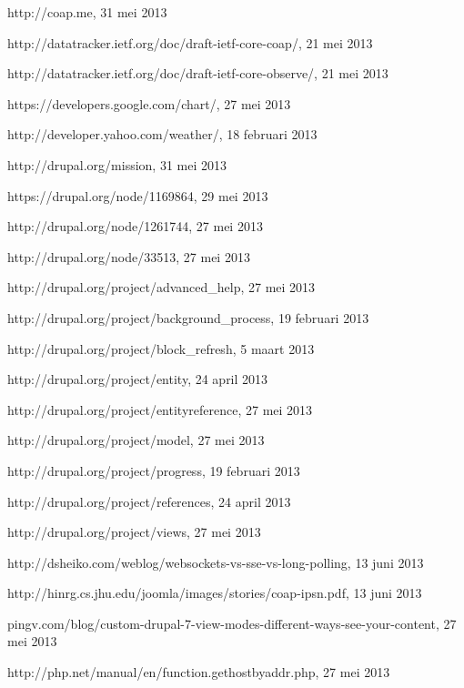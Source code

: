 \begin{thebibliography}{99}
 http://coap.me, 31 mei 2013

 http://datatracker.ietf.org/doc/draft-ietf-core-coap/, 21 mei 2013

 http://datatracker.ietf.org/doc/draft-ietf-core-observe/, 21 mei 2013

 https://developers.google.com/chart/, 27 mei 2013

 http://developer.yahoo.com/weather/, 18 februari 2013

 http://drupal.org/mission, 31 mei 2013

 https://drupal.org/node/1169864, 29 mei 2013

 http://drupal.org/node/1261744, 27 mei 2013

 http://drupal.org/node/33513, 27 mei 2013

 http://drupal.org/project/advanced\_help, 27 mei 2013

 http://drupal.org/project/background\_process, 19 februari 2013

 http://drupal.org/project/block\_refresh, 5 maart 2013

 http://drupal.org/project/entity, 24 april 2013

 http://drupal.org/project/entityreference, 27 mei 2013

 http://drupal.org/project/model, 27 mei 2013

 http://drupal.org/project/progress, 19 februari 2013

 http://drupal.org/project/references, 24 april 2013

 http://drupal.org/project/views, 27 mei 2013

 http://dsheiko.com/weblog/websockets-vs-sse-vs-long-polling, 13 juni 2013

 http://hinrg.cs.jhu.edu/joomla/images/stories/coap-ipsn.pdf, 13 juni 2013

 pingv.com/blog/custom-drupal-7-view-modes-different-ways-see-your-content, 27 mei 2013

 http://php.net/manual/en/function.gethostbyaddr.php, 27 mei 2013


\end{thebibliography}
